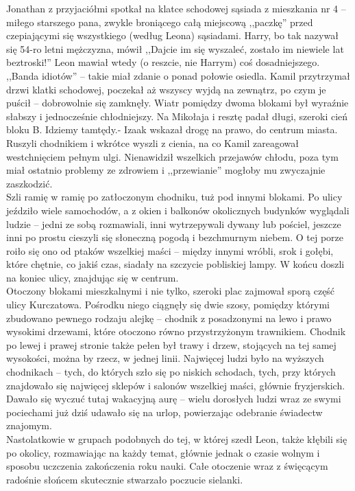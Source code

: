 \documentclass[../MAIN.tex]{subfiles}
\begin{document}
Jonathan z przyjaciółmi spotkał na klatce schodowej sąsiada z mieszkania nr 4 -- miłego starszego pana, zwykle broniącego całą miejscową ,,paczkę'' przed czepiającymi się wszystkiego (według Leona) sąsiadami. Harry, bo tak nazywał się 54-ro letni mężczyzna, mówił ,,Dajcie im się wyszaleć, zostało im niewiele lat beztroski!'' Leon mawiał wtedy (o reszcie, nie Harrym) coś dosadniejszego.
,,Banda idiotów'' -- takie miał zdanie o ponad połowie osiedla.
Kamil przytrzymał drzwi klatki schodowej, poczekał aż wszyscy wyjdą na zewnątrz, po czym je puścił -- dobrowolnie się zamknęły. Wiatr pomiędzy dwoma blokami był wyraźnie słabszy i jednocześnie chłodniejszy. Na Mikołaja i resztę padał długi, szeroki cień bloku B.
\sx Idziemy tamtędy.- Izaak wskazał drogę na prawo, do centrum miasta.
\qd
Ruszyli chodnikiem i wkrótce wyszli z cienia, na co Kamil zareagował westchnięciem pełnym ulgi. Nienawidził wszelkich przejawów chłodu, poza tym miał ostatnio problemy ze zdrowiem i ,,przewianie'' mogłoby mu zwyczajnie zaszkodzić.\\
Szli ramię w ramię po zatłoczonym chodniku, tuż pod innymi blokami. Po ulicy jeździło wiele samochodów, a z okien i balkonów okolicznych budynków wyglądali ludzie -- jedni ze sobą rozmawiali, inni wytrzepywali dywany lub pościel, jeszcze inni po prostu cieszyli się słoneczną pogodą i bezchmurnym niebem. O tej porze roiło się ono od ptaków wszelkiej maści -- między innymi wróbli, srok i gołębi, które chętnie, co jakiś czas, siadały na szczycie pobliskiej lampy. W końcu doszli na koniec ulicy, znajdując się w centrum. \\
Otoczony blokami mieszkalnymi i nie tylko, szeroki plac zajmował sporą część ulicy Kurczatowa. Pośrodku niego ciągnęły się dwie szosy, pomiędzy którymi zbudowano pewnego rodzaju alejkę -- chodnik z posadzonymi na lewo i prawo wysokimi drzewami, które otoczono równo przystrzyżonym trawnikiem. Chodnik po lewej i prawej stronie także pełen był trawy i drzew, stojących na tej samej wysokości, można by rzecz, w jednej linii. Najwięcej ludzi było na wyższych chodnikach -- tych, do których szło się po niskich schodach, tych, przy których znajdowało się najwięcej sklepów i salonów wszelkiej maści, głównie fryzjerskich. Dawało się wyczuć tutaj wakacyjną aurę -- wielu dorosłych ludzi wraz ze swymi pociechami już dziś udawało się na urlop, powierzając odebranie świadectw znajomym. \\
Nastolatkowie w grupach podobnych do tej, w której szedł Leon, także kłębili się po okolicy, rozmawiając na każdy temat, głównie jednak o czasie wolnym i sposobu uczczenia zakończenia roku nauki. Całe otoczenie wraz z święcącym radośnie słońcem skutecznie stwarzało poczucie sielanki.
\end{document}
